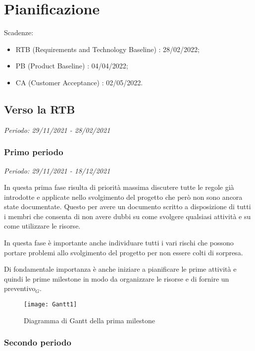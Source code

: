 \chapter{Pianificazione}

Scadenze:
\begin{itemize}
    \item RTB (Requirements and Technology Baseline) : 28/02/2022;
    \item PB (Product Baseline) : 04/04/2022;
    \item CA (Customer Acceptance) : 02/05/2022.
\end{itemize}

\section{Verso la RTB}

\textit{Periodo: 29/11/2021 - 28/02/2021}

\subsection{Primo periodo}

\textit{Periodo: 29/11/2021 - 18/12/2021}

In questa prima fase risulta di priorità massima discutere tutte le regole già introdotte
e applicate nello svolgimento del progetto che però non sono ancora state documentate.
Questo per avere un documento scritto a disposizione di tutti i membri che consenta di
non avere dubbi su come svolgere qualsiasi attività e su come utilizzare le risorse.
\par In questa fase è importante anche individuare tutti i vari rischi che possono portare
problemi allo svolgimento del progetto per non essere colti di sorpresa.
\par Di fondamentale importanza è anche iniziare a pianificare le prime attività e quindi
le prime milestone in modo da organizzare le risorse e di fornire un preventivo$_G$.

\begin{figure}[!ht]
    \texttt{[image: Gantt1]}
    \caption{Diagramma di Gantt della prima milestone}
\end{figure}

\newpage

\subsection{Secondo periodo}

